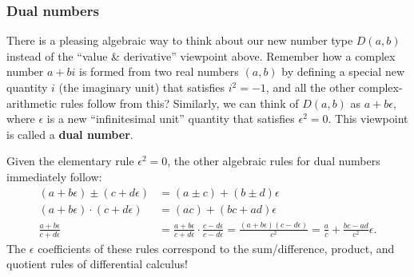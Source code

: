 \subsubsection{Dual numbers}

There is a pleasing algebraic way to think about our new number type $D(a,b)$ instead of the ``value \& derivative'' viewpoint above.   Remember how a complex number $a + bi$ is formed from two real numbers $(a,b)$ by defining a special new quantity $i$ (the imaginary unit) that satisfies $i^2 = -1$, and all the other complex-arithmetic rules follow from this?   Similarly, we can think of $D(a,b)$ as $a + b \epsilon$, where $\epsilon$ is a new ``infinitesimal unit'' quantity that satisfies $\epsilon^2 = 0$.   This viewpoint is called a \textbf{dual number}.

Given the elementary rule $\epsilon^2 = 0$, the other algebraic rules for dual numbers immediately follow:
\begin{align*}
    (a + b \epsilon) \pm (c + d \epsilon) &= (a \pm c) + (b \pm d) \epsilon \\
    (a + b \epsilon) \cdot (c + d\epsilon) &= (ac) + (bc + ad) \epsilon \\
    \frac{a + b \epsilon}{c + d \epsilon} &= \frac{a + b \epsilon}{c + d \epsilon} \cdot \frac{c - d \epsilon}{c - d \epsilon} = \frac{(a + b \epsilon)(c - d \epsilon)}{c^2}  =     
    \frac{a}{c} + \frac{bc - ad}{c^2}\epsilon.
\end{align*}
The $\epsilon$ coefficients of these rules correspond to the sum/difference, product, and quotient rules of differential calculus!

